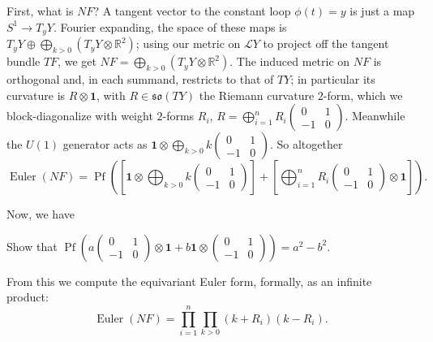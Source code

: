 \documentclass[12pt,letterpaper,reqno]{article}
\numberwithin{equation}{section}
\newcommand{\fso}{{\mathfrak {so}}}
\newcommand{\cL}{\ensuremath{\mathcal L}}
\newcommand{\R}{\ensuremath{\mathbb R}}
\newcommand{\bid}{{\mathbf 1}}
\DeclareMathOperator{\Pf}{Pf}
\DeclareMathOperator{\Euler}{Euler}
\newcommand{\fixme}[1]{{\color{orange}{[#1]}}}
\begin{document}
First, what is $NF$?
A tangent vector to the constant loop $\phi(t) = y$
is just a map $S^1 \to T_y Y$. 
Fourier expanding, the space of these maps is
$T_y Y \oplus \bigoplus_{k > 0} (T_y Y \otimes \R^2)$; using our metric
on $\cL Y$ to project off the tangent bundle $TF$, 
we get $NF = \bigoplus_{k > 0} (T_y Y \otimes \R^2)$.
The induced metric on $NF$ is orthogonal and, in each summand,
restricts to that of $TY$; in particular its curvature is $R \otimes \bid$, 
with $R \in \fso(TY)$ the Riemann curvature $2$-form,
which we block-diagonalize with weight $2$-forms $R_i$,
$R = \bigoplus_{i=1}^n R_i \begin{pmatrix} 0 & 1 \\ -1 & 0 \end{pmatrix}$.
Meanwhile the $U(1)$ generator acts as
$\bid \otimes \bigoplus_{k>0} k \begin{pmatrix} 0 & 1 \\ -1 & 0 \end{pmatrix}$.
So altogether
\begin{equation}
  \Euler(NF) = \Pf \left( \left[ \bid \otimes \bigoplus_{k>0} k \begin{pmatrix} 0 & 1 \\ -1 & 0 \end{pmatrix} \right] +  \left[ \bigoplus_{i=1}^n R_i \begin{pmatrix} 0 & 1 \\ -1 & 0 \end{pmatrix} \otimes \bid \right] \right).
\end{equation}

Now, we have
\begin{exercise}
Show that $\Pf \left( a \begin{pmatrix} 0 & 1 \\ -1 & 0 \end{pmatrix} \otimes \bid + b \bid \otimes \begin{pmatrix} 0 & 1 \\ -1 & 0 \end{pmatrix} \right) = a^2 - b^2$.  \fixme{check signs}
\end{exercise}

From this we compute the equivariant Euler form, formally, as an infinite product:
\begin{equation}
  \Euler(NF) = \prod_{i=1}^n \prod_{k > 0} (k + R_i) (k - R_i).
\end{equation} 
\end{document}
